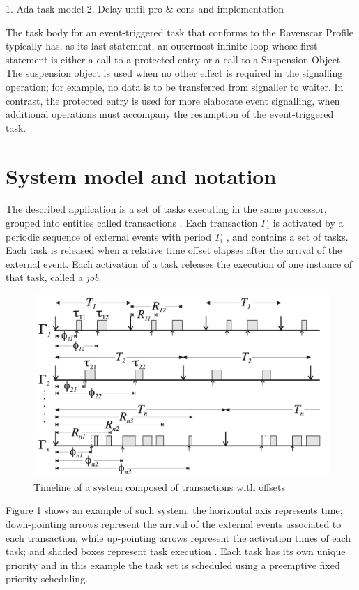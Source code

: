 \documentclass{article}
\begin{document}
1. Ada task model
2. Delay until pro \& cons and implementation \cite{absolute-delay}

The task body for an event-triggered task that conforms to the Ravenscar Profile typically has, as its last statement, an outermost infinite loop whose first statement is either a call to a protected entry or a call to a Suspension Object. The suspension object is used when no other effect is required in the signalling operation; for example, no data is to be transferred from signaller to waiter. In contrast, the protected entry is used for more elaborate event signalling, when additional operations must accompany the resumption of the event-triggered task.

\section{System model and notation}\label{model-notation}

The described application is a set of tasks executing in the same processor, grouped into entities called transactions \cite{tindell-offsets}. Each transaction $\Gamma_i$ is activated by a periodic sequence of external events with period $T_i$ , and contains a set of tasks. Each task is released when a relative time offset elapses after the arrival of the external event. Each activation of a task releases the execution of one instance of that task, called a \textit{job}.

\begin{figure}[!htbp]
\centering
\includegraphics[width=5in]{images/transactions}
\caption{Timeline of a system composed of transactions with offsets \cite{pessimistic-rma}}
\label{transactions}
\end{figure}

Figure \ref{transactions} shows an example of such system: the horizontal axis represents time; down-pointing arrows represent the arrival of the external events associated to each transaction, while up-pointing arrows represent the activation times of each task; and shaded boxes represent task execution \cite{pessimistic-rma}. Each task has its own unique priority and in this example the task set is scheduled using a preemptive fixed priority scheduling.
\end{document}
